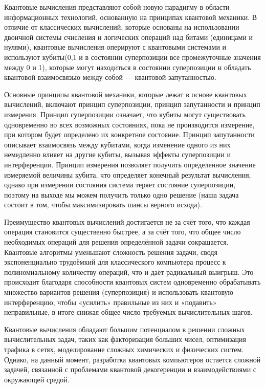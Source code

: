 
\textbf{}

Квантовые вычисления представляют собой новую парадигму в области информационных технологий, основанную на принципах квантовой механики. В отличие от классических вычислений, которые основаны на использовании двоичной системы счисления и логических операций над битами (единицами и нулями), квантовые вычисления оперируют с квантовыми системами и используют кубиты(0,1 и в состоянии суперпозиции все промежуточные значения между 0 и 1), которые могут находиться в состоянии суперпозиции и обладать квантовой взаимосвязью между собой — квантовой запутанностью. 

Основные принципы квантовой механики, которые лежат в основе квантовых вычислений, включают принцип суперпозиции, принцип запутанности и принцип измерения. Принцип суперпозиции означает, что кубиты могут существовать одновременно во всех возможных состояниях, пока не производится измерение, при котором будет определено их конкретное состояние. Принцип запутанности описывает взаимосвязь между кубитами, когда изменение одного из них немедленно влияет на другие кубиты, вызывая эффекты суперпозиции и интерференции. Принцип измерения позволяет получить определенное значение измеряемой величины кубита, что определяет конечный результат вычисления, однако при измерении состояния система теряет состояние суперпозиции, поэтому на выходе мы можем получить только одно решение (наша задача состоит в том, чтобы максимизировать шансы верного исхода). 

Преимущество квантовых вычислений достигается не за счёт того, что каждая операция становится существенно быстрее, а за счёт того, что общее число необходимых операций для решения определённой задачи сокращается. Квантовые алгоритмы уменьшают сложность решения задачи, сводя экспоненциально трудоёмкий для классического компьютера процесс к полиномиальному количеству операций, что и даёт радикальный выигрыш. Это происходит благодаря способности квантовых систем одновременно обрабатывать множество вариантов решения (суперпозиция) и использовать квантовую интерференцию, чтобы «усилить» правильные из них и «подавить» неправильные, в итоге снижая общее число требуемых вычислительных шагов.

Квантовые вычисления обладают большим потенциалом в решении сложных вычислительных задач, таких как факторизация больших чисел, оптимизация трафика в сетях, моделирование сложных химических и физических систем. Однако, на данный момент, разработка квантовых компьютеров остается сложной задачей, связанной с проблемами квантовой декогеренции и взаимодействиями с окружающей средой.
\textbf{}

